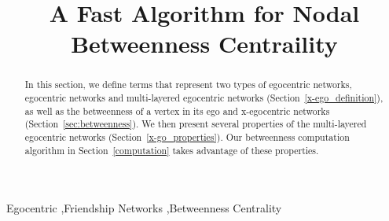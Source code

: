 \documentclass[preprint,12pt,authoryear]{elsarticle}
\theoremstyle{definition}
\begin{document}
\begin{frontmatter}



\title{A Fast Algorithm for Nodal Betweenness Centraility}


\author{}

\address{}

\begin{abstract}
In this section, we define terms that represent two types of egocentric networks, egocentric networks and multi-layered egocentric networks (Section~\ref{x-ego_definition}), as well as the betweenness of a vertex in its ego and x-egocentric networks (Section~\ref{sec:betweenness}).
We then present several properties of the multi-layered egocentric networks (Section~\ref{x-go_properties}).
Our betweenness computation algorithm in Section~\ref{computation} takes advantage of these properties.


\end{abstract}

\begin{keyword}
Egocentric \sep Friendship Networks \sep Betweenness Centrality



\end{keyword}

\end{frontmatter}
\end{document}
